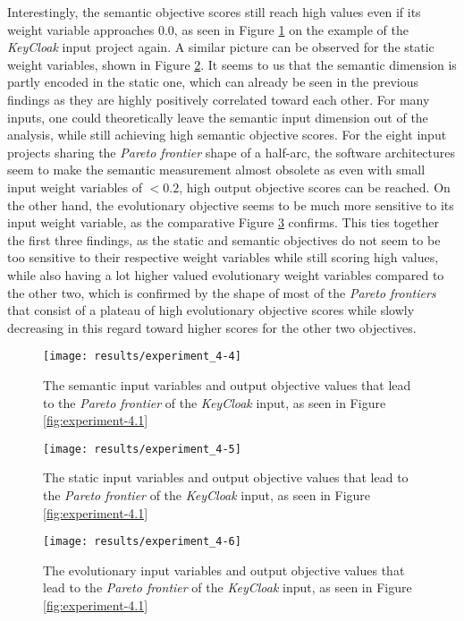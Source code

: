 \documentclass[12pt,a4paper]{report}
\begin{document}
Interestingly, the semantic objective scores still reach high values even if
its weight variable approaches $0.0$, as seen in Figure \ref{fig:experiment-4.4}
on the example of the \textit{KeyCloak} input project again.
A similar picture can be observed for the static weight variables, shown in
Figure \ref{fig:experiment-4.5}.
It seems to us that the semantic dimension is partly encoded in the static one,
which can already be seen in the previous findings as they are highly
positively correlated toward each other. For many inputs, one could theoretically
leave the semantic input dimension out of the analysis, while still achieving high
semantic objective scores. For the eight input projects sharing
the \textit{Pareto frontier} shape of a half\hyp arc, the software architectures
seem to make the semantic measurement almost obsolete as even with small input
weight variables of $<0.2$, high output objective scores can be reached.
On the other hand, the evolutionary objective seems to be much more sensitive
to its input weight variable, as the comparative Figure \ref{fig:experiment-4.6}
confirms. This ties together the first three findings, as the static and
semantic objectives do not seem to be too sensitive to their respective weight
variables while still scoring high values, while also having a lot higher valued
evolutionary weight variables compared to the other two, which is confirmed by
the shape of most of the \textit{Pareto frontiers} that consist of a plateau
of high evolutionary objective scores while slowly decreasing in this regard
toward higher scores for the other two objectives.

\begin{figure}[htbp]
\centering
\texttt{[image: results/experiment\_4-4]}
\caption{The semantic input variables and output objective values that lead to the \textit{Pareto frontier} of the \textit{KeyCloak} input, as seen in Figure \ref{fig:experiment-4.1}}
\label{fig:experiment-4.4}
\end{figure}

\begin{figure}[htbp]
\centering
\texttt{[image: results/experiment\_4-5]}
\caption{The static input variables and output objective values that lead to the \textit{Pareto frontier} of the \textit{KeyCloak} input, as seen in Figure \ref{fig:experiment-4.1}}
\label{fig:experiment-4.5}
\end{figure}

\begin{figure}[htbp]
\centering
\texttt{[image: results/experiment\_4-6]}
\caption{The evolutionary input variables and output objective values that lead to the \textit{Pareto frontier} of the \textit{KeyCloak} input, as seen in Figure \ref{fig:experiment-4.1}}
\label{fig:experiment-4.6}
\end{figure}
\end{document}

